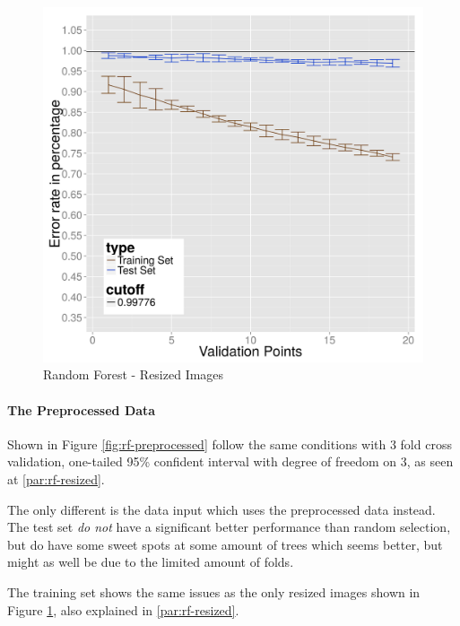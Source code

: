 \begin{figure}
  \centering
  \includegraphics[width=0.9\linewidth]{Images/DRFraw}
  \caption{Random Forest - Resized Images}
  \label{fig:rf-resized}
\end{figure}

\paragraph{The Preprocessed Data}
Shown in Figure \ref{fig:rf-preprocessed} follow the same conditions with 3 fold cross validation, one-tailed 95\% confident interval with degree of freedom on 3, as seen at \ref{par:rf-resized}.

The only different is the data input which uses the preprocessed data instead.
The test set \emph{do not} have a significant better performance than random selection, but do have some sweet spots at some amount of trees which seems better, but might as well be due to the limited amount of folds.

The training set shows the same issues as the only resized images shown in Figure \ref{fig:rf-resized}, also explained in \ref{par:rf-resized}.

